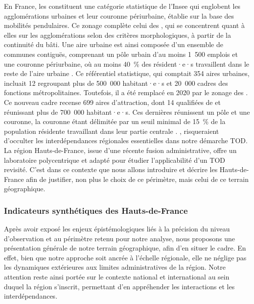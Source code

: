 \begin{refsegment}
{    En France, les  constituent une catégorie statistique de l'Insee qui englobent les agglomérations urbaines et leur couronne périurbaine, établie sur la base des mobilités pendulaires. Ce zonage complète celui des , qui se concentrent quant à elles sur les agglomérations selon des critères morphologiques, à partir de la continuité du bâti. Une aire urbaine est ainsi composée d'un ensemble de communes contiguës, comprenant un pôle urbain d'au moins 1~500 emplois et une couronne périurbaine, où au moins 40~\% des résident·e·s travaillent dans le reste de l'aire urbaine \textcolor{blue}{\autocite{geoconfluences_aire_2024}}. Ce référentiel statistique, qui comptait 354 aires urbaines, incluait 12  regroupant plus de 500~000 habitant·e·s et 20~000 cadres des fonctions métropolitaines. Toutefois, il a été remplacé en 2020 par le zonage des  \textcolor{blue}{\autocite{brutel_maillage_2011}}. Ce nouveau cadre recense 699 aires d'attraction, dont 14 qualifiées de  et réunissant plus de 700~000 habitant·e·s. Ces dernières réunissent un pôle et une couronne, la couronne étant délimitée par un seuil minimal de 15~\% de la population résidente travaillant dans leur partie centrale \textcolor{blue}{\autocite{insee_aires_2021}}.
}, risqueraient d’occulter les interdépendances régionales essentielles dans notre démarche \acrshort{TOD}. La région Hauts-de-France, issue d’une récente fusion administrative, offre un laboratoire polycentrique et adapté pour étudier l'applicabilité d'un \acrshort{TOD} revisité. C’est dans ce contexte que nous allons introduire et décrire les Hauts-de-France afin de justifier, non plus le choix de ce périmètre, mais celui de ce terrain géographique.%

\subsubsection*{Indicateurs synthétiques des Hauts-de-France
    \label{chap3:region-hdf-situation}
    }

Après avoir exposé les enjeux épistémologiques liés à la précision du niveau d'observation et au périmètre retenu pour notre analyse, nous proposons une présentation générale de notre terrain géographique, afin d'en situer le cadre. En effet, bien que notre approche soit ancrée à l'échelle régionale, elle ne néglige pas les dynamiques extérieures aux limites administratives de la région. Notre attention reste ainsi portée sur le contexte national et international au sein duquel la région s'inscrit, permettant d'en appréhender les interactions et les interdépendances.%


\end{refsegment}
